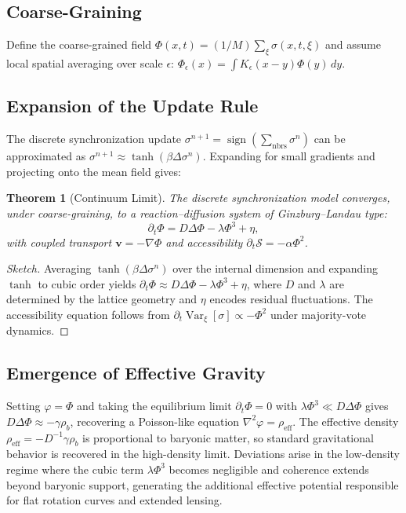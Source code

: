 \documentclass[11pt, a4paper, twocolumn]{article}
\newtheorem{theorem}[definition]{Theorem}
\newcommand{\Sfield}{\mathcal{S}}
\begin{document}
{\subsection{Coarse-Graining}

Define the coarse-grained field
$\Phi(x,t) = (1/M)\sum_\xi\sigma(x,t,\xi)$
and assume local spatial averaging over scale $\epsilon$:
$\Phi_\epsilon(x) = \int K_\epsilon(x-y)\Phi(y)\,dy$.

\subsection{Expansion of the Update Rule}

The discrete synchronization update
$\sigma^{n+1} = \operatorname{sign}(\sum_{\text{nbrs}}\sigma^n)$
can be approximated as $\sigma^{n+1} \approx \tanh(\beta\Delta\sigma^n)$.
Expanding for small gradients and projecting onto the mean field gives:

\begin{theorem}[Continuum Limit]
The discrete synchronization model converges, under coarse-graining, to a
reaction--diffusion system of Ginzburg--Landau type:
\[
    \partial_t \Phi = D\Delta\Phi - \lambda\Phi^3 + \eta,
\]
with coupled transport $\mathbf{v} = -\nabla\Phi$ and accessibility
$\partial_t\Sfield = -\alpha\Phi^2$.
\end{theorem}

\begin{proof}[Sketch]
Averaging $\tanh(\beta\Delta\sigma^n)$ over the internal dimension and
expanding $\tanh$ to cubic order yields $\partial_t\Phi \approx
D\Delta\Phi - \lambda\Phi^3 + \eta$, where $D$ and $\lambda$ are determined
by the lattice geometry and $\eta$ encodes residual fluctuations. The
accessibility equation follows from $\partial_t\operatorname{Var}_\xi[\sigma]
\propto -\Phi^2$ under majority-vote dynamics.
\end{proof}

\subsection{Emergence of Effective Gravity}

Setting $\varphi = \Phi$ and taking the equilibrium limit $\partial_t\Phi = 0$
with $\lambda\Phi^3 \ll D\Delta\Phi$ gives $D\Delta\Phi \approx
-\gamma\rho_b$, recovering a Poisson-like equation
$\nabla^2\varphi = \rho_{\mathrm{eff}}$. The effective density
$\rho_{\mathrm{eff}} = -D^{-1}\gamma\rho_b$ is proportional to baryonic
matter, so standard gravitational behavior is recovered in the high-density
limit. Deviations arise in the low-density regime where the cubic term
$\lambda\Phi^3$ becomes negligible and coherence extends beyond baryonic
support, generating the additional effective potential responsible for flat
rotation curves and extended lensing.

}
\end{document}
